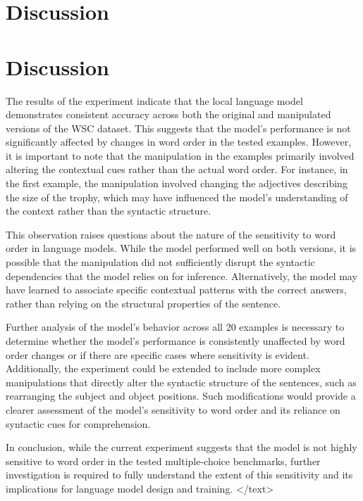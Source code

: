 \documentclass{article}
\begin{document}
\section{Discussion}
\section*{Discussion}

The results of the experiment indicate that the local language model demonstrates consistent accuracy across both the original and manipulated versions of the WSC dataset. This suggests that the model's performance is not significantly affected by changes in word order in the tested examples. However, it is important to note that the manipulation in the examples primarily involved altering the contextual cues rather than the actual word order. For instance, in the first example, the manipulation involved changing the adjectives describing the size of the trophy, which may have influenced the model's understanding of the context rather than the syntactic structure. 

This observation raises questions about the nature of the sensitivity to word order in language models. While the model performed well on both versions, it is possible that the manipulation did not sufficiently disrupt the syntactic dependencies that the model relies on for inference. Alternatively, the model may have learned to associate specific contextual patterns with the correct answers, rather than relying on the structural properties of the sentence. 

Further analysis of the model's behavior across all 20 examples is necessary to determine whether the model's performance is consistently unaffected by word order changes or if there are specific cases where sensitivity is evident. Additionally, the experiment could be extended to include more complex manipulations that directly alter the syntactic structure of the sentences, such as rearranging the subject and object positions. Such modifications would provide a clearer assessment of the model's sensitivity to word order and its reliance on syntactic cues for comprehension. 

In conclusion, while the current experiment suggests that the model is not highly sensitive to word order in the tested multiple-choice benchmarks, further investigation is required to fully understand the extent of this sensitivity and its implications for language model design and training.
</text>
\end{document}
